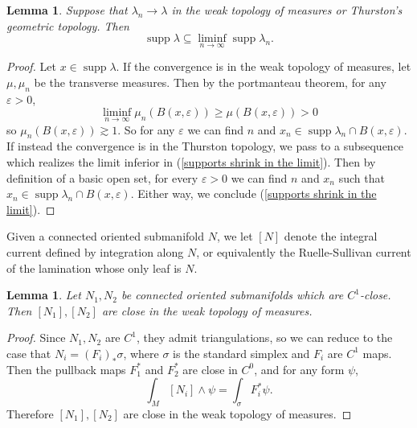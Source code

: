 \documentclass[reqno,11pt]{amsart}
\DeclareMathOperator{\supp}{supp}
\newtheorem{lemma}[theorem]{Lemma}
\theoremstyle{definition}
\numberwithin{equation}{section}
\begin{document}
\begin{lemma}
Suppose that $\lambda_n \to \lambda$ in the weak topology of measures or Thurston's geometric topology.
Then 
\begin{equation}\label{supports shrink in the limit}
\supp \lambda \subseteq \liminf_{n \to \infty} \supp \lambda_n.
\end{equation}
\end{lemma}
\begin{proof}
Let $x \in \supp \lambda$.
If the convergence is in the weak topology of measures, let $\mu, \mu_n$ be the transverse measures.
Then by the portmanteau theorem, for any $\varepsilon > 0$,
$$\liminf_{n \to \infty} \mu_n(B(x, \varepsilon)) \geq \mu(B(x, \varepsilon)) > 0$$
so $\mu_n(B(x, \varepsilon)) \gtrsim 1$.
So for any $\varepsilon$ we can find $n$ and $x_n \in \supp \lambda_n \cap B(x, \varepsilon)$.
If instead the convergence is in the Thurston topology, we pass to a subsequence which realizes the limit inferior in (\ref{supports shrink in the limit}).
Then by definition of a basic open set, for every $\varepsilon > 0$ we can find $n$ and $x_n$ such that $x_n \in \supp \lambda_n \cap B(x, \varepsilon)$.
Either way, we conclude (\ref{supports shrink in the limit}).
\end{proof}

Given a connected oriented submanifold $N$, we let $[N]$ denote the integral current defined by integration along $N$, or equivalently the Ruelle-Sullivan current of the lamination whose only leaf is $N$.

\begin{lemma}
Let $N_1, N_2$ be connected oriented submanifolds which are $C^1$-close.
Then $[N_1], [N_2]$ are close in the weak topology of measures.
\end{lemma}
\begin{proof}
Since $N_1, N_2$ are $C^1$, they admit triangulations, so we can reduce to the case that $N_i = (F_i)_* \sigma$, where $\sigma$ is the standard simplex and $F_i$ are $C^1$ maps.
Then the pullback maps $F_1^*$ and $F_2^*$ are close in $C^0$, and for any form $\psi$,
$$\int_M [N_i] \wedge \psi = \int_\sigma F^*_i \psi.$$
Therefore $[N_1], [N_2]$ are close in the weak topology of measures.
\end{proof}
\end{document}

